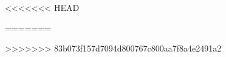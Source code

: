 \documentclass[12pt]{article}
\begin{document}
\thispagestyle{empty}

	
	\pagebreak
	
	\tableofcontents\label{toc}
	\pagebreak

	
	
	
	
	\pagebreak
	
	
	
<<<<<<< HEAD
	
	
	
	
	
=======
	
>>>>>>> 83b073f157d7094d800767c800aa7f8a4e2491a2
	
	\pagebreak

  
\end{document}
